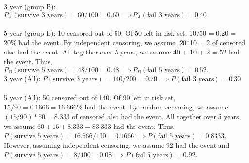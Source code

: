 \documentclass{article}
\begin{document}
3 year (group B): $P_A(\text{survive 3 years})= 60/100 = 0.60 \implies P_A(\text{fail 3 years}) = 0.40$ \\ \\
5 year (group B): 10 censored out of 60. Of 50 left in risk set, 10/50 = 0.20 = 20\% had the event. By independent censoring, we assume .20*10 = 2 of censored also had the event. All together over 5 years, we assume 40 + 10 + 2 = 52 had the event. Thus, $P_B(\text{survive 5 years})= 48/100 = 0.48 \implies P_B(\text{fail 5 years}) = 0.52.$ \\


3 year (All): $P(\text{survive 3 years})= 140/200 = 0.70 \implies P(\text{fail 3 years}) = 0.30$ \\ \\
5 year (All): 50 censored out of 140. Of 90 left in risk set, $15/90 = 0.1\overline{666} = 16.\overline{666}\%$ had the event. By random censoring, we assume $(15/90)*50 = 8.\overline{333}$ of censored also had the event. All together over 5 years, we assume $60 + 15 + 8.\overline{333} = 83.\overline{333}$ had the event. Thus, $P(\text{survive 5 years})= 16.\overline{666}/100 = 0.1\overline{666} \implies P(\text{fail 5 years}) = 0.8\overline{333}$. However, assuming independent censoring, we assume 92 had the event and  $P(\text{survive 5 years})= 8/100 = 0.08 \implies P(\text{fail 5 years}) = 0.92$.
\end{document}
